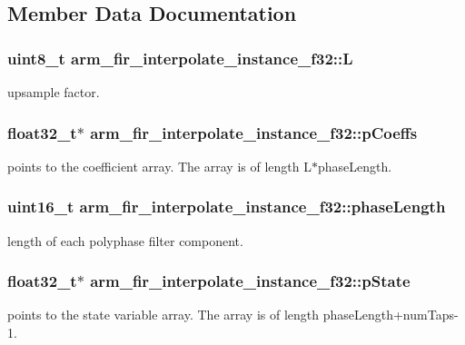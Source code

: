 \subsection{Member Data Documentation}
\hypertarget{structarm__fir__interpolate__instance__f32_ae6f94dcc0ccd8aa4bc699b20985d9df5}{
\subsubsection[{L}]{\setlength{\rightskip}{0pt plus 5cm}uint8\-\_\-t arm\-\_\-fir\-\_\-interpolate\-\_\-instance\-\_\-f32\-::\-L}}\label{structarm__fir__interpolate__instance__f32_ae6f94dcc0ccd8aa4bc699b20985d9df5}
upsample factor. \hypertarget{structarm__fir__interpolate__instance__f32_a86053b715980a93c9df630d6de5bb63c}{
\subsubsection[{p\-Coeffs}]{\setlength{\rightskip}{0pt plus 5cm}float32\-\_\-t$\ast$ arm\-\_\-fir\-\_\-interpolate\-\_\-instance\-\_\-f32\-::p\-Coeffs}}\label{structarm__fir__interpolate__instance__f32_a86053b715980a93c9df630d6de5bb63c}
points to the coefficient array. The array is of length L$\ast$phase\-Length. \hypertarget{structarm__fir__interpolate__instance__f32_a389e669e13ec56292a70db8e92194b12}{
\subsubsection[{phase\-Length}]{\setlength{\rightskip}{0pt plus 5cm}uint16\-\_\-t arm\-\_\-fir\-\_\-interpolate\-\_\-instance\-\_\-f32\-::phase\-Length}}\label{structarm__fir__interpolate__instance__f32_a389e669e13ec56292a70db8e92194b12}
length of each polyphase filter component. \hypertarget{structarm__fir__interpolate__instance__f32_a42a8ba1bda85fa86d7b6c84d3da4c75b}{
\subsubsection[{p\-State}]{\setlength{\rightskip}{0pt plus 5cm}float32\-\_\-t$\ast$ arm\-\_\-fir\-\_\-interpolate\-\_\-instance\-\_\-f32\-::p\-State}}\label{structarm__fir__interpolate__instance__f32_a42a8ba1bda85fa86d7b6c84d3da4c75b}
points to the state variable array. The array is of length phase\-Length+num\-Taps-\/1. 

